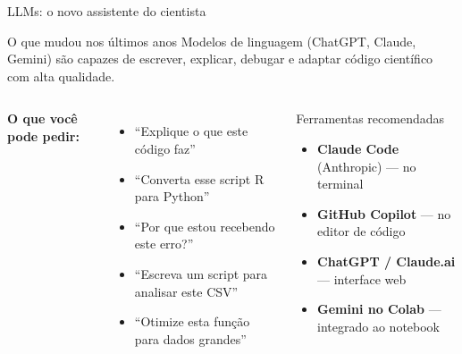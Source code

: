 \begin{frame}[shrink=5]{LLMs: o novo assistente do cientista}
\begin{block}{O que mudou nos últimos anos}
Modelos de linguagem (ChatGPT, Claude, Gemini) são capazes de escrever, explicar, debugar e adaptar código científico com alta qualidade.
\end{block}

\vspace{0.3cm}

\begin{columns}
\textbf{O que você pode pedir:}
\begin{itemize}
    \item ``Explique o que este código faz''
    \item ``Converta esse script R para Python''
    \item ``Por que estou recebendo este erro?''
    \item ``Escreva um script para analisar este CSV''
    \item ``Otimize esta função para dados grandes''
\end{itemize}

\begin{exampleblock}{Ferramentas recomendadas}
\begin{itemize}
    \item \textbf{Claude Code} (Anthropic) — no terminal
    \item \textbf{GitHub Copilot} — no editor de código
    \item \textbf{ChatGPT / Claude.ai} — interface web
    \item \textbf{Gemini no Colab} — integrado ao notebook
\end{itemize}
\end{exampleblock}
\end{columns}
\end{frame}

